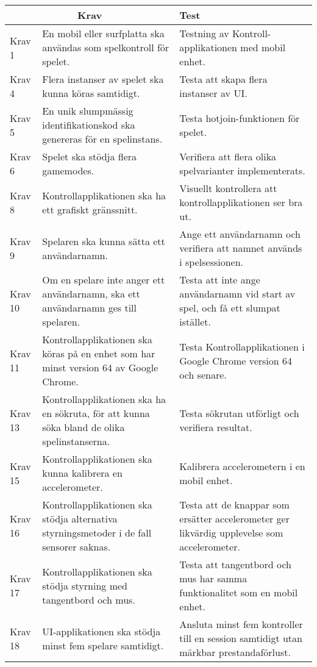 	\begin{tabular}{| p{1.5cm} | p{6cm} | p{8cm}|}

  \hline
    \multicolumn{2}{|c|}{Krav}&{Test}\\
    \hline

		Krav 1&En mobil eller surfplatta ska användas som spelkontroll för spelet.&Testning av Kontroll-applikationen med mobil enhet.\\
		\hline
		Krav 4& Flera instanser av spelet ska kunna köras samtidigt. & Testa att skapa flera instanser av UI.\\
		\hline
		Krav 5& En unik slumpmässig identifikationskod ska genereras för en spelinstans. &Testa hotjoin-funktionen för spelet.\\
		\hline
		Krav 6& Spelet ska stödja flera gamemodes. &Verifiera att flera olika spelvarianter implementerats.\\
		\hline
		Krav 8& Kontrollapplikationen ska ha ett grafiskt gränssnitt. &Visuellt kontrollera att kontrollapplikationen ser bra ut.\\
		\hline
		Krav 9& Spelaren ska kunna sätta ett användarnamn. &Ange ett användarnamn och verifiera att namnet används i spelsessionen.\\
		\hline
		Krav 10& Om en spelare inte anger ett användarnamn, ska ett användarnamn ges till spelaren. &Testa att inte ange användarnamn vid start av spel, och få ett slumpat istället. \\
		\hline
		Krav 11& Kontrollapplikationen ska köras på en enhet som har minst version 64 av Google Chrome. &Testa Kontrollapplikationen i Google Chrome version 64 och senare.\\
		\hline
		Krav 13& Kontrollapplikationen ska ha en sökruta, för att kunna söka bland de olika spelinstanserna. &Testa sökrutan utförligt och verifiera resultat. \\
		\hline
		Krav 15& Kontrollapplikationen ska kunna kalibrera en accelerometer. &Kalibrera accelerometern i en mobil enhet.\\
		\hline
		Krav 16& Kontrollapplikationen ska stödja alternativa styrningsmetoder i de fall sensorer saknas. &Testa att de knappar som ersätter accelerometer ger likvärdig upplevelse som accelerometer.\\
		\hline
		Krav 17& Kontrollapplikationen ska stödja styrning med tangentbord och mus. &Testa att tangentbord och mus har samma funktionalitet som en mobil enhet.\\
		\hline
		Krav 18& UI-applikationen ska stödja minst fem spelare samtidigt. &Ansluta minst fem kontroller till en session samtidigt utan märkbar prestandaförlust.\\

\end{tabular}
